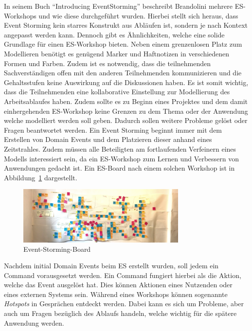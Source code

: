 In seinem Buch ``Introducing EventStorming'' beschreibt Brandolini mehrere \ac{ES}-Workshops und wie diese durchgeführt wurden\cite*{introES}.
Hierbei stellt sich heraus, dass Event Storming kein starres Konstrukt aus Abläufen ist, sondern je nach Kontext angepasst werden kann.
Dennoch gibt es Ähnlichkeiten, welche eine solide Grundlage für einen \ac{ES}-Workshop bieten\cite*{introES}.
Neben einem grenzenlosen Platz zum Modellieren benötigt es genügend Marker und Haftnotizen in verschiedenen Formen und Farben.
Zudem ist es notwendig, dass die teilnehmenden Sachverständigen offen mit den anderen Teilnehmenden kommunizieren und die Gehaltsstufen keine Auswirkung
auf die Diskussionen haben.
Es ist somit wichtig, dass die Teilnehmenden eine kollaborative Einstellung zur Modellierung des Arbeitsablaufes haben.
Zudem sollte es zu Beginn eines Projektes und dem damit einhergehenden \ac{ES}-Workshop keine Grenzen zu dem Thema oder der Anwendung welche modelliert werden soll geben.
Dadurch sollen weitere Probleme gelöst oder Fragen beantwortet werden.
Ein Event Storming beginnt immer mit dem Erstellen von Domain Events und dem Platzieren dieser anhand eines Zeitstrahles.
Zudem müssen alle Beteiligten am fortlaufenden Verfeinern eines Modells interessiert sein, da ein \ac{ES}-Workshop zum Lernen und Verbessern
von Anwendungen gedacht ist.
Ein \ac{ES}-Board nach einem solchen Workshop ist in Abbildung~\ref{fig:rlBoard} dargestellt\cite*{esBoard}.

\begin{figure}[ht]
    \centering
    \includegraphics[width=0.75\textwidth]{images/2.1/event-storming}
    \caption{Event-Storming-Board}
    \label{fig:rlBoard}
\end{figure}

Nachdem initial Domain Events beim \ac{ES} erstellt wurden, soll jedem ein Command vorausgesetzt werden.
Ein Command fungiert hierbei als die Aktion, welche das Event ausgelöst hat.
Dies können Aktionen eines Nutzenden oder eines externen Systems sein.
Während eines Workshops können sogenannte \textit{Hotspots} in Gesprächen entdeckt werden.
Dabei kann es sich um Probleme, aber auch um Fragen bezüglich des Ablaufs handeln, welche wichtig für die spätere Anwendung werden.

